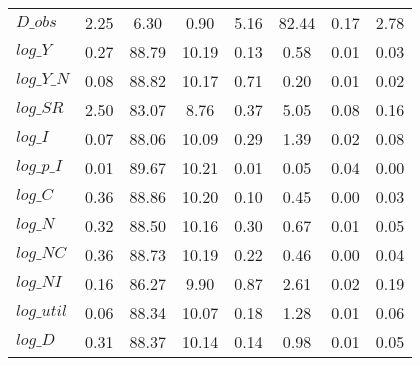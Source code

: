 \begin{center}
\begin{longtable}{lccccccc}
$D\_obs     $	 & 	        2.25	 & 	        6.30	 & 	        0.90	 & 	        5.16	 & 	       82.44	 & 	        0.17	 & 	        2.78 \\ 
$log\_Y     $	 & 	        0.27	 & 	       88.79	 & 	       10.19	 & 	        0.13	 & 	        0.58	 & 	        0.01	 & 	        0.03 \\ 
$log\_Y\_N  $	 & 	        0.08	 & 	       88.82	 & 	       10.17	 & 	        0.71	 & 	        0.20	 & 	        0.01	 & 	        0.02 \\ 
$log\_SR    $	 & 	        2.50	 & 	       83.07	 & 	        8.76	 & 	        0.37	 & 	        5.05	 & 	        0.08	 & 	        0.16 \\ 
$log\_I     $	 & 	        0.07	 & 	       88.06	 & 	       10.09	 & 	        0.29	 & 	        1.39	 & 	        0.02	 & 	        0.08 \\ 
$log\_p\_I  $	 & 	        0.01	 & 	       89.67	 & 	       10.21	 & 	        0.01	 & 	        0.05	 & 	        0.04	 & 	        0.00 \\ 
$log\_C     $	 & 	        0.36	 & 	       88.86	 & 	       10.20	 & 	        0.10	 & 	        0.45	 & 	        0.00	 & 	        0.03 \\ 
$log\_N     $	 & 	        0.32	 & 	       88.50	 & 	       10.16	 & 	        0.30	 & 	        0.67	 & 	        0.01	 & 	        0.05 \\ 
$log\_NC    $	 & 	        0.36	 & 	       88.73	 & 	       10.19	 & 	        0.22	 & 	        0.46	 & 	        0.00	 & 	        0.04 \\ 
$log\_NI    $	 & 	        0.16	 & 	       86.27	 & 	        9.90	 & 	        0.87	 & 	        2.61	 & 	        0.02	 & 	        0.19 \\ 
$log\_util  $	 & 	        0.06	 & 	       88.34	 & 	       10.07	 & 	        0.18	 & 	        1.28	 & 	        0.01	 & 	        0.06 \\ 
$log\_D     $	 & 	        0.31	 & 	       88.37	 & 	       10.14	 & 	        0.14	 & 	        0.98	 & 	        0.01	 & 	        0.05 \\ 
\end{longtable}
 \end{center}
